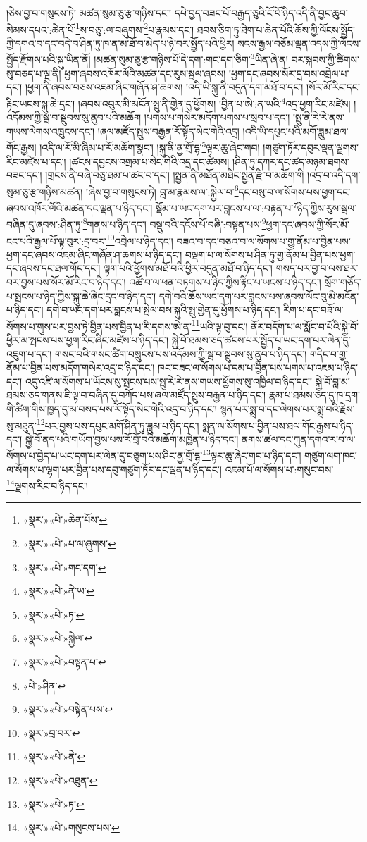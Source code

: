 །ཅེས་བྱ་བ་གསུངས་ཏེ། མཚན་སུམ་ཅུ་རྩ་གཉིས་དང་། དཔེ་བྱད་བཟང་པོ་བརྒྱད་ཅུའི་ངོ་བོ་ཉིད་འདི་ནི་བྱང་ཆུབ་སེམས་དཔའ་:ཆེན་པོ་\footnote{«སྣར་»«པེ་»ཆེན་པོས་}ས་བཅུ་:ལ་བཞུགས་\footnote{«སྣར་»«པེ་»པ་ལ་ཞུགས་}པ་རྣམས་དང་། ཐབས་ཅིག་ཏུ་ཐེག་པ་ཆེན་པོའི་ཆོས་ཀྱི་ལོངས་སྤྱོད་ཀྱི་དགའ་བ་དང་བདེ་བ་ཤིན་ཏུ་ཁ་ན་མ་ཐོ་བ་མེད་པ་ཉེ་བར་སྤྱོད་པའི་ཕྱིར། སངས་རྒྱས་བཅོམ་ལྡན་འདས་ཀྱི་ལོངས་སྤྱོད་རྫོགས་པའི་སྐུ་ཡིན་ནོ། །མཚན་སུམ་ཅུ་རྩ་གཉིས་པོ་དེ་དག་:གང་དག་ཅིག་\footnote{«སྣར་»«པེ་»གང་དག་}ཡིན་ཞེ་ན། བར་སྐབས་ཀྱི་ཚིགས་སུ་བཅད་པ་ལྔ་ནི། ཕྱག་ཞབས་འཁོར་ལོའི་མཚན་དང་རུས་སྦལ་ཞབས། །ཕྱག་དང་ཞབས་སོར་དྲ་བས་འབྲེལ་པ་དང་། །ཕྱག་ནི་ཞབས་བཅས་འཇམ་ཞིང་གཞོན་ཤ་ཆགས། །འདི་ཡི་སྐུ་ནི་བདུན་དག་མཐོ་བ་དང་། །སོར་མོ་རིང་དང་རྟིང་ཡངས་སྐུ་ཆེ་དྲང་། །ཞབས་འབུར་མི་མངོན་སྤུ་ནི་གྱེན་དུ་ཕྱོགས། །བྱིན་པ་ཨེ་:ན་ཡའི་\footnote{«སྣར་»«པེ་»ནེ་ཡ་}འདྲ་ཕྱག་རིང་མཛེས། །འདོམས་ཀྱི་སྦ་བ་སྦུབས་སུ་ནུབ་པའི་མཆོག །པགས་པ་གསེར་མདོག་པགས་པ་སྲབ་པ་དང་། །སྤུ་ནི་རེ་རེ་ནས་གཡས་ལེགས་འཁྲུངས་དང་། །ཞལ་མཛོད་སྤུས་བརྒྱན་རོ་སྟོད་སེང་གེའི་འདྲ། །འདི་ཡི་དཔུང་པའི་མགོ་ཟླུམ་ཐལ་གོང་རྒྱས། །འདི་ལ་རོ་མི་ཞིམ་པ་རོ་མཆོག་སྣང་། །སྐུ་ནི་ནྱ་གྲོ་དྷ་\footnote{«སྣར་»«པེ་»ཏ་}ལྟར་ཆུ་ཞེང་གབ། །གཙུག་ཏོར་དབུར་ལྡན་ལྗགས་རིང་མཛེས་པ་དང་། །ཚངས་དབྱངས་འགྲམ་པ་སེང་གེའི་འདྲ་དང་ཚེམས། །ཤིན་ཏུ་དཀར་དང་ཚད་མཉམ་ཐགས་བཟང་དང་། །གྲངས་ནི་བཞི་བཅུ་ཐམ་པ་ཚང་བ་དང་། །སྤྱན་ནི་མཐོན་མཐིང་སྤྱན་རྫི་བ་མཆོག་གི །འདྲ་བ་འདི་དག་སུམ་ཅུ་རྩ་གཉིས་མཚན། །ཞེས་བྱ་བ་གསུངས་ཏེ། བླ་མ་རྣམས་ལ་:སྐྱེལ་བ་\footnote{«སྣར་»«པེ་»སྐྱེལ་}དང་བསུ་བ་ལ་སོགས་པས་ཕྱག་དང་ཞབས་འཁོར་ལོའི་མཚན་དང་ལྡན་པ་ཉིད་དང་། སྡོམ་པ་ཡང་དག་པར་བླངས་པ་ལ་:བརྟན་པ་\footnote{«སྣར་»«པེ་»བསྟན་པ་}ཉིད་ཀྱིས་རུས་སྦལ་བཞིན་དུ་ཞབས་:ཤིན་ཏུ་\footnote{«པེ་»ཤིན་}གནས་པ་ཉིད་དང་། བསྡུ་བའི་དངོས་པོ་བཞི་:བསྟན་པས་\footnote{«སྣར་»«པེ་»བསྟེན་པས་}ཕྱག་དང་ཞབས་ཀྱི་སོར་མོ་ངང་པའི་རྒྱལ་པོ་ལྟ་བུར་:དྲ་བར་\footnote{«སྣར་»བྲ་བར་}འབྲེལ་པ་ཉིད་དང་། བཟའ་བ་དང་བཅའ་བ་ལ་སོགས་པ་གྱ་ནོམ་པ་བྱིན་པས་ཕྱག་དང་ཞབས་འཇམ་ཞིང་གཞོན་ཤ་ཆགས་པ་ཉིད་དང་། བལྡག་པ་ལ་སོགས་པ་ཤིན་ཏུ་གྱ་ནོམ་པ་བྱིན་པས་ཕྱག་དང་ཞབས་དང་ཐལ་གོང་དང་། ལྟག་པའི་ཕྱོགས་མཐོ་བའི་ཕྱིར་བདུན་མཐོ་བ་ཉིད་དང་། གསད་པར་བྱ་བ་ལས་ཐར་བར་བྱས་པས་སོར་མོ་རིང་བ་ཉིད་དང་། འཚོ་བ་ལ་ཕན་བཏགས་པ་ཉིད་ཀྱིས་རྟིང་པ་ཡངས་པ་ཉིད་དང་། སྲོག་གཅོད་པ་སྤངས་པ་ཉིད་ཀྱིས་སྐུ་ཆེ་ཞིང་དྲང་བ་ཉིད་དང་། དགེ་བའི་ཆོས་ཡང་དག་པར་བླངས་པས་ཞབས་ལོང་བུ་མི་མངོན་པ་ཉིད་དང་། དགེ་བ་ཡང་དག་པར་བླངས་པ་སྤེལ་བས་སྐུའི་སྤུ་གྱེན་དུ་ཕྱོགས་པ་ཉིད་དང་། རིག་པ་དང་བཟོ་ལ་སོགས་པ་གུས་པར་བྱས་ཏེ་བྱིན་པས་བྱིན་པ་རི་དགས་ཨེ་ན་\footnote{«སྣར་»«པེ་»ནེ་}ཡའི་ལྟ་བུ་དང་། ནོར་བདོག་པ་ལ་སློང་བ་པོའི་སྐྱེ་བོ་ཕྱིར་མ་སྤངས་པས་ཕྱག་རིང་ཞིང་མཛེས་པ་ཉིད་དང་། སྐྱེ་བོ་ཐམས་ཅད་ཚངས་པར་སྤྱོད་པ་ཡང་དག་པར་ལེན་དུ་འཇུག་པ་དང་། གསང་བའི་གསང་ཚིག་བསྲུངས་པས་འདོམས་ཀྱི་སྦ་བ་སྦུབས་སུ་ནུབ་པ་ཉིད་དང་། གདིང་བ་གྱ་ནོམ་པ་བྱིན་པས་མདོག་གསེར་འདྲ་བ་ཉིད་དང་། ཁང་བཟང་ལ་སོགས་པ་དམ་པ་བྱིན་པས་པགས་པ་འཇམ་པ་ཉིད་དང་། འདུ་འཛི་ལ་སོགས་པ་ཡོངས་སུ་སྤངས་པས་སྤུ་རེ་རེ་ནས་གཡས་ཕྱོགས་སུ་འཁྱིལ་བ་ཉིད་དང་། སྐྱེ་བོ་བླ་མ་ཐམས་ཅད་གནས་ཇི་ལྟ་བ་བཞིན་དུ་བཀོད་པས་ཞལ་མཛོད་སྤུས་བརྒྱན་པ་ཉིད་དང་། རྣམ་པ་ཐམས་ཅད་དུ་ཁ་དྲག་གི་ཚིག་གིས་ཁྱད་དུ་མ་བསད་པས་རོ་སྟོད་སེང་གེའི་འདྲ་བ་ཉིད་དང་། སྙན་པར་སྨྲ་བ་དང་ལེགས་པར་སྨྲ་བའི་རྗེས་སུ་མཐུན་\footnote{«སྣར་»«པེ་»འཐུན་}པར་བྱས་པས་དཔུང་མགོ་ཤིན་ཏུ་ཟླུམ་པ་ཉིད་དང་། སྨན་ལ་སོགས་པ་བྱིན་པས་ཐལ་གོང་རྒྱས་པ་ཉིད་དང་། སྐྱེ་བོ་ནད་པའི་གཡོག་བྱས་པས་རོ་བྲོ་བའི་མཆོག་མཁྱེན་པ་ཉིད་དང་། ནགས་ཚལ་དང་ཀུན་དགའ་ར་བ་ལ་སོགས་པ་བྱེད་པ་ཡང་དག་པར་ལེན་དུ་བཅུག་པས་ཤིང་ནྱ་གྲོ་དྷ་\footnote{«སྣར་»«པེ་»ཏ་}ལྟར་ཆུ་ཞེང་གབ་པ་ཉིད་དང་། གཙུག་ལག་ཁང་ལ་སོགས་པ་ལྷག་པར་བྱིན་པས་དབུ་གཙུག་ཏོར་དང་ལྡན་པ་ཉིད་དང་། འཇམ་པོ་ལ་སོགས་པ་:གསུང་བས་\footnote{«སྣར་»«པེ་»གསུངས་པས་}ལྗགས་རིང་བ་ཉིད་དང་། 